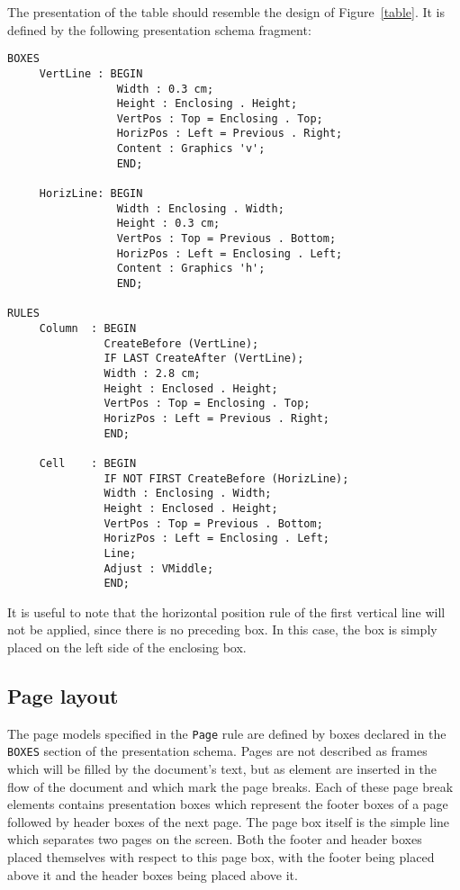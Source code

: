 \begin{example}
The presentation of the table should resemble the design of
Figure~\ref{table}.  It is defined by the following presentation
schema fragment:

\begin{verbatim}
BOXES
     VertLine : BEGIN
                 Width : 0.3 cm;
                 Height : Enclosing . Height;
                 VertPos : Top = Enclosing . Top;
                 HorizPos : Left = Previous . Right;
                 Content : Graphics 'v';
                 END;

     HorizLine: BEGIN
                 Width : Enclosing . Width;
                 Height : 0.3 cm;
                 VertPos : Top = Previous . Bottom;
                 HorizPos : Left = Enclosing . Left;
                 Content : Graphics 'h';
                 END;

RULES
     Column  : BEGIN
               CreateBefore (VertLine);
               IF LAST CreateAfter (VertLine);
               Width : 2.8 cm;
               Height : Enclosed . Height;
               VertPos : Top = Enclosing . Top;
               HorizPos : Left = Previous . Right;
               END;

     Cell    : BEGIN
               IF NOT FIRST CreateBefore (HorizLine);
               Width : Enclosing . Width;
               Height : Enclosed . Height;
               VertPos : Top = Previous . Bottom;
               HorizPos : Left = Enclosing . Left;
               Line;
               Adjust : VMiddle;
               END;
\end{verbatim}
It is useful to note that the horizontal position rule of the first
vertical line will not be applied, since there is no preceding box.
In this case, the box is simply placed on the left side of the
enclosing box.

\end{example}

\subsection{Page layout}
\label{page}

The page models specified in the {\tt Page} rule are defined by boxes
declared in the {\tt BOXES} section of the presentation schema.  Pages
are not described as frames which will be filled by the document's
text, but as element are inserted in the flow of the document and which
mark the page breaks.  Each of these page break elements contains
presentation boxes which represent the footer boxes of a page followed
by header boxes of the next page.  The page box itself is the simple
line which separates two pages on the screen.  Both the footer and
header boxes placed themselves with respect to this page box, with the
footer being placed above it and the header boxes being placed above
it.

